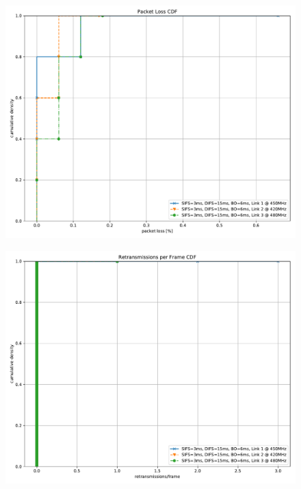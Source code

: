 \documentclass{article}
\begin{document}
\begin{figure}
	\includegraphics[width=\textwidth]{rb_high_single/cdf/packet_loss_cdf}
\end{figure}

\begin{figure}
	\includegraphics[width=\textwidth]{rb_high_single/cdf/retransmissions_per_frame_cdf}
\end{figure}
\end{document}
